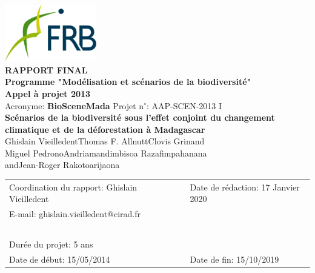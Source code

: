 \renewcommand{\bibsection}{}
\begin{center}
\includegraphics[width=4cm]{figures/FRB.png}\\
\vspace{1cm}
{\large
  \textbf{
    RAPPORT FINAL\\
    Programme "Modélisation et scénarios de la biodiversité"\\
    Appel à projet 2013\\
  }
}
\vspace{1cm}
Acronyme: \textbf{BioSceneMada} \hspace{2cm} Projet n$^{\circ}$: AAP-SCEN-2013 I\\
\vspace{1cm}
{\Large \textbf{Scénarios de la biodiversité sous l'effet conjoint du changement climatique et de la déforestation à Madagascar}}\\
\vspace{1cm}
{\large 
  Ghislain Vieilledent\hspace{1cm}Thomas F. Allnutt\hspace{1cm}Clovis Grinand\\
  \vspace{0.25cm}
  Miguel Pedrono\hspace{1cm}Andriamandimbisoa Razafimpahanana\\
  \vspace{0.25cm}
  and\hspace{1cm}Jean-Roger Rakotoarijaona\\
}
\vspace{1cm}
\begin{tabular}{lcl}
Coordination du rapport: Ghislain Vieilledent & \hspace{1cm} & Date de rédaction: 17 Janvier 2020\\
E-mail: ghislain.vieilledent@cirad.fr & \hspace{1cm} & ~ \\ 
~ & ~ \\
Durée du projet: 5 ans & \hspace{1cm} & ~ \\  
Date de début: 15/05/2014 & \hspace{1cm} & Date de fin: 15/10/2019\\
\end{tabular}
\end{center}
\newpage